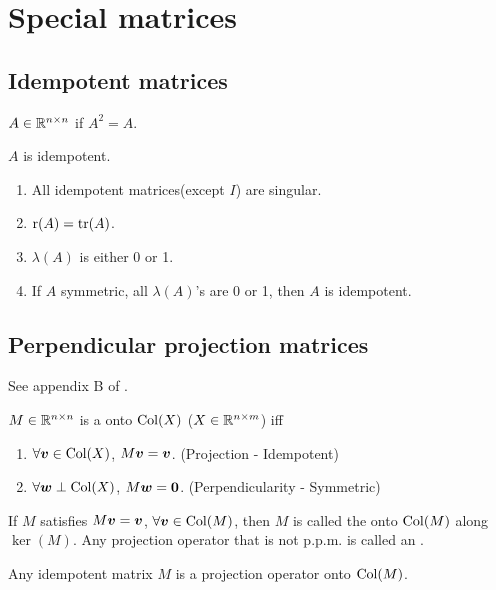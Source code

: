 \documentclass[10pt,a4paper]{book}
\begin{document}
\section{Special matrices}\label{sec:spec_mat}
\subsection{Idempotent matrices}\label{sec:idempotent}
\begin{defbox}
	\begin{definition}\label{def:idempotent}
		$A\in\mathbb R^{n\times n}$ if $A^2=A$.  
	\end{definition}
\end{defbox}

\begin{thmbox}
	\begin{theorem}\label{thm:idempotent}
		$A$ is idempotent.  
		\begin{enumerate}
			\item All idempotent matrices(except $I$) are singular.
			\item $\mathrm{r}(A)=\mathrm{tr}(A)$. 
			\item $\lambda(A)$ is either 0 or 1. 
			\item If $A$ symmetric, all $\lambda(A)$'s are 0 or 1, then $A$ is idempotent. 
		\end{enumerate}
	\end{theorem}
\end{thmbox}

\subsection{Perpendicular projection matrices}\label{sec:ppm}
See appendix B of \cite{christensen2002plane}.
\begin{defbox}
	\begin{definition}\label{def:ppm}
		$M\in\mathbb R^{n\times n}$ is a  onto $\mathrm{Col}(X)$ ($X\in\mathbb R^{n\times m}$) iff 
		\begin{enumerate}
			\item $\forall {\boldsymbol v}\in\mathrm{Col}(X)$, $M{\boldsymbol v}={\boldsymbol v}$. (Projection - Idempotent)
			\item $\forall {\boldsymbol w}\perp\mathrm{Col}(X)$, $M{\boldsymbol w}={\boldsymbol 0}$. (Perpendicularity - Symmetric)  
		\end{enumerate}  

	If $M$ satisfies $M{\boldsymbol v}={\boldsymbol v}$, $\forall {\boldsymbol v}\in\mathrm{Col}(M)$, then $M$ is called the  onto $\mathrm{Col}(M)$ along $\ker(M)$.
	Any projection operator that is not p.p.m. is called an .
	\end{definition}
\end{defbox}
Any idempotent matrix $M$ is a projection operator onto $\mathrm{Col}(M)$. 
\end{document}
